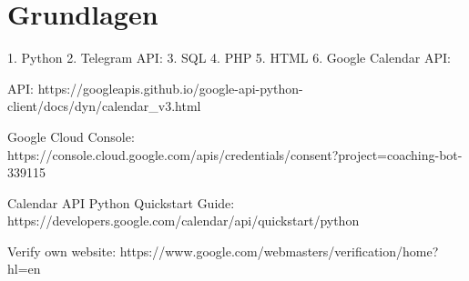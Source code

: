 \chapter{Grundlagen}

1. Python
2. Telegram API: 
3. SQL
4. PHP
5. HTML
6. Google Calendar API: 

API: https://googleapis.github.io/google-api-python-client/docs/dyn/calendar_v3.html 

Google Cloud Console: https://console.cloud.google.com/apis/credentials/consent?project=coaching-bot-339115 

Calendar API Python Quickstart Guide: https://developers.google.com/calendar/api/quickstart/python 

Verify own website: https://www.google.com/webmasters/verification/home?hl=en